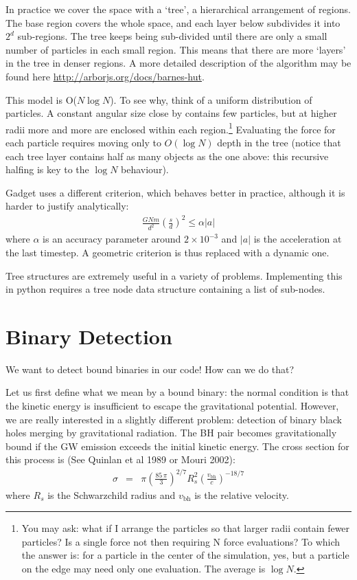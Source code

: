 \documentclass[12pt]{article}
\begin{document}
In practice we cover the space with a `tree', a hierarchical arrangement of regions. The base region covers the whole space, and each layer below subdivides it into $2^d$ sub-regions. The tree keeps being sub-divided until there are only a small number of particles in each small region. This means that there are more `layers' in the tree in denser regions. A more detailed description of the algorithm may be found here \url{http://arborjs.org/docs/barnes-hut}.

This model is O($N \log N$). To see why, think of a uniform distribution of particles. A constant angular size close by contains few particles, but at higher radii more and more are enclosed within each region.\footnote{You may ask: what if I arrange the particles so that larger radii contain fewer particles? Is a single force not then requiring N force evaluations? To which the answer is: for a particle in the center of the simulation, yes, but a particle on the edge may need only one evaluation. The average is $\log N$.} Evaluating the force for each particle requires moving only to $O(\log N)$ depth in the tree (notice that each tree layer contains half as many objects as the one above: this recursive halfing is key to the $\log N$ behaviour).

Gadget uses a different criterion, which behaves better in practice, although it is harder to justify analytically:
\begin{align}
 \frac{G N m}{d^2} \left(\frac{s}{d}\right)^2 \leq \alpha |a|
\end{align}
where $\alpha$ is an accuracy parameter around $2 \times 10^{-3}$ and $|a|$ is the acceleration at the last timestep. A geometric criterion is thus replaced with a dynamic one.

Tree structures are extremely useful in a variety of problems. Implementing this in python requires a tree node data structure containing a list of sub-nodes.

\section{Binary Detection}

We want to detect bound binaries in our code! How can we do that?

Let us first define what we mean by a bound binary: the normal condition is that the kinetic energy is insufficient to escape the gravitational potential. However, we are really interested in a slightly different problem: detection of binary black holes merging by gravitational radiation. The BH pair becomes gravitationally bound if the GW
emission exceeds the initial kinetic energy. The cross
section for this process is (See Quinlan et al 1989 or Mouri 2002):
\begin{eqnarray}
     \sigma &=& \pi \left( \frac{85\, \pi}{3}
     \right)^{2/7} R_{s}^2 \left(\frac{v_\mathrm{bh}}{c}\right)^{-18/7}
\label{eqn:crosssection}
\end{eqnarray}
where $R_s$ is the Schwarzchild radius and $v_\mathrm{bh}$ is the relative velocity.
\end{document}
